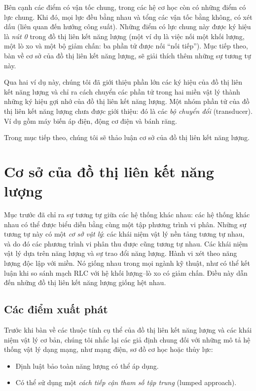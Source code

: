 Bên cạnh các điểm có vận tốc chung, trong các hệ cơ học còn có những điểm có lực chung. Khi đó, mọi lực đều bằng nhau và tổng các vận tốc bằng không, có xét dấu (liên quan đến hướng công suất). Những điểm có lực chung này được ký hiệu là \emph{nút 0} trong đồ thị liên kết năng lượng (một ví dụ là việc nối một khối lượng, một lò xo và một bộ giảm chấn: ba phần tử được nối ``nối tiếp''). Mục tiếp theo, bàn về cơ sở của đồ thị liên kết năng lượng, sẽ giải thích thêm những sự tương tự này.

Qua hai ví dụ này, chúng tôi đã giới thiệu phần lớn các ký hiệu của đồ thị liên kết năng lượng và chỉ ra cách chuyển các phần tử trong hai miền vật lý thành những ký hiệu gợi nhớ của đồ thị liên kết năng lượng. Một nhóm phần tử của đồ thị liên kết năng lượng chưa được giới thiệu: đó là các \emph{bộ chuyển đổi} (transducer). Ví dụ gồm máy biến áp điện, động cơ điện và bánh răng.

Trong mục tiếp theo, chúng tôi sẽ thảo luận cơ sở của đồ thị liên kết năng lượng.

\section{Cơ sở của đồ thị liên kết năng lượng}
Mục trước đã chỉ ra sự tương tự giữa các hệ thống khác nhau: các hệ thống khác nhau có thể được biểu diễn bằng cùng một tập phương trình vi phân. Những sự tương tự này có một \emph{cơ sở vật lý}: các khái niệm vật lý nền tảng tương tự nhau, và do đó các phương trình vi phân thu được cũng tương tự nhau. Các khái niệm vật lý dựa trên năng lượng và sự trao đổi năng lượng. Hành vi xét theo năng lượng độc lập với miền. Nó giống nhau trong mọi ngành kỹ thuật, như có thể kết luận khi so sánh mạch RLC với hệ khối lượng--lò xo có giảm chấn. Điều này dẫn đến những đồ thị liên kết năng lượng giống hệt nhau.

\subsection{Các điểm xuất phát}
Trước khi bàn về các thuộc tính cụ thể của đồ thị liên kết năng lượng và các khái niệm vật lý cơ bản, chúng tôi nhắc lại các giả định chung đối với những mô tả hệ thống vật lý dạng mạng, như mạng điện, sơ đồ cơ học hoặc thủy lực:
\begin{itemize}
\item Định luật bảo toàn năng lượng có thể áp dụng.
\item Có thể sử dụng một \emph{cách tiếp cận tham số tập trung} (lumped approach).
\end{itemize}

